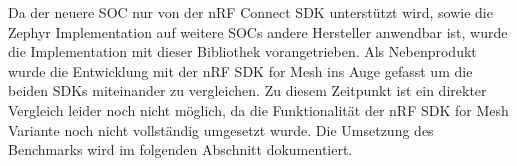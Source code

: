 Da der neuere SOC nur von der nRF Connect SDK unterstützt wird, sowie die Zephyr Implementation auf weitere SOCs andere Hersteller anwendbar ist, wurde die Implementation mit dieser Bibliothek vorangetrieben. Als Nebenprodukt wurde die Entwicklung mit der nRF SDK for Mesh ins Auge gefasst um die beiden SDKs miteinander zu vergleichen. Zu diesem Zeitpunkt ist ein direkter Vergleich leider noch nicht möglich, da die Funktionalität der nRF SDK for Mesh Variante noch nicht vollständig umgesetzt wurde. Die Umsetzung des Benchmarks wird im folgenden Abschnitt dokumentiert.

